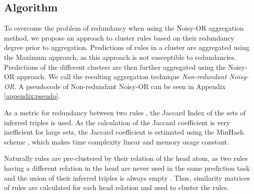 \documentclass[akbc,twoside,11pt,lettersize]{article}
\begin{document}
\subsection{Algorithm}

To overcome the problem of redundancy when using the Noisy-OR aggregation method, we propose an approach to cluster rules based on their redundancy degree prior to aggregation. Predictions of rules in a cluster are aggregated using the Maximum approach, as this approach is not susceptible to redundancies. Predictions of the different clusters are then further aggregated using the Noisy-OR approach. We call the resulting aggregation technique \textit{Non-redundant Noisy-OR}. A pseudocode of Non-redundant Noisy-OR can be seen in Appendix \ref{appendix:pseudo}.

As a metric for redundancy between two rules ,  the Jaccard Index  of the sets of inferred triples is used. As the calculation of the Jaccard coefficient is very inefficient for large sets, the Jaccard coefficient is estimated using the MinHash scheme \cite{Broder_1997}, which makes time complexity linear and memory usage constant.





Naturally rules are pre-clustered by their relation of the head atom, as two rules having a different relation in the head are never used in the same prediction task and the union of their inferred triples is always empty . Thus, similarity matrices of rules are calculated for each head relation and used to cluster the rules. 
\end{document}
